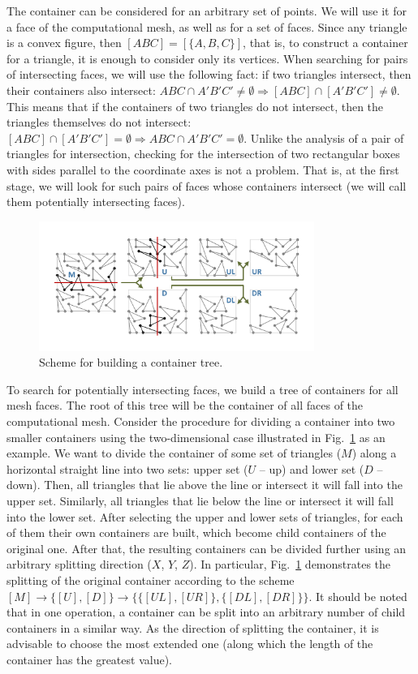 \documentclass[
11pt,
tightenlines,
twoside,
onecolumn,
nofloats,
nobibnotes,
nofootinbib,
superscriptaddress,
noshowpacs,
centertags]
{revtex4}
\begin{document}
The container can be considered for an arbitrary set of points.
We will use it for a face of the computational mesh, as well as for a set of faces.
Since any triangle is a convex figure, then $[ABC] = [\{A, B, C\}]$, that is, to construct a container for a triangle, it is enough to consider only its vertices.
When searching for pairs of intersecting faces, we will use the following fact: if two triangles intersect, then their containers also intersect: $ABC \cap A'B'C' \ne \emptyset \Rightarrow [ABC] \cap [A'B'C'] \ne\emptyset$.
This means that if the containers of two triangles do not
intersect, then the triangles themselves do not intersect: $[ABC]
\cap [A'B'C'] = \emptyset \Rightarrow ABC \cap A'B'C' = \emptyset$.
Unlike the analysis of a pair of triangles for intersection,
checking for  the intersection of two rectangular boxes with sides
parallel to the coordinate axes is not a problem.
That is, at the first stage, we will look for such pairs of faces
whose  containers intersect (we will call them potentially
intersecting faces).

\begin{figure}[h]
\includegraphics[width=0.8\textwidth]{pics/pic_box_size.pdf}
\caption{Scheme for building a container tree.}\label{fig:pic_box}
\end{figure}

To search for potentially intersecting faces, we build a tree of
containers  for all mesh faces.
The root of this tree will be the container of all faces of the
computational  mesh.
Consider the procedure for dividing a container into two smaller
containers  using the two-dimensional case illustrated in
Fig.~\ref{fig:pic_box} as an example.
We want to divide the container of some set of triangles ($M$) along
a  horizontal straight line into two sets: upper set ($U$ -- up) and
lower set ($D$ -- down).
Then, all triangles that lie above the line or intersect it will
fall into the upper set.
Similarly, all triangles that lie below the line or intersect it will fall into the lower set.
After selecting the upper and lower sets of triangles, for each of them their own containers are built, which become child containers of the original one.
After that, the resulting containers can be divided further using an arbitrary splitting direction ($X$, $Y$, $Z$).
In particular, Fig.~\ref{fig:pic_box} demonstrates the splitting of the original container according to the scheme $[M] \rightarrow \{[U], [D]\} \rightarrow \{\{[UL], [UR]\}, \{[DL], [DR]\}\}$.
It should be noted that in one operation, a container can be split into an arbitrary number of child containers in a similar way.
As the direction of splitting the container, it is advisable to choose the most extended one (along which the length of the container has the greatest value).
\end{document}
